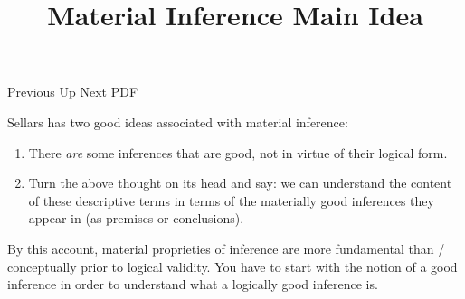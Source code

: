 \documentclass[12pt,a4paper]{report}
\begin{document}
 \href{doc/phil/People/Brandom/OnSellars/2009/Lecture02/MaterialInference.html}{Previous} 
 \href{doc/phil/People/Brandom/OnSellars/2009/Lecture02.html}{Up} 
 \href{doc/phil/People/Brandom/OnSellars/2009/Lecture02/PhilofLogicAside.html}{Next} 
 \href{doc/phil/People/Brandom/OnSellars/2009/Lecture02/MaterialInferenceMainIdea.pdf}{PDF} 
\title{Material Inference Main Idea}

Sellars has two good ideas associated with material inference:
\begin{enumerate}
\item There \emph{are} some inferences that are good, not in virtue of their logical form.
\item Turn the above thought on its head and say: we can understand the content of these descriptive terms in terms of the materially good inferences they appear in (as premises or conclusions).
\end{enumerate}


By this account, material proprieties of inference are more fundamental than / conceptually prior to logical validity. You have to start with the notion of a good inference in order to understand what a logically good inference is.
\end{document}
